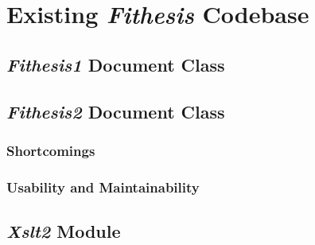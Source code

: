 \chapter{Existing \emph{Fithesis} Codebase}
  \blindtext
  
  \section{\emph{Fithesis1} Document Class}
  \blindtext

  \section{\emph{Fithesis2} Document Class}
  \blindtext

    \subsection{Shortcomings}
    \blindtext

    \subsection{Usability and Maintainability}
    \blindtext

  \section{\emph{Xslt2} Module}
  \blindtext
